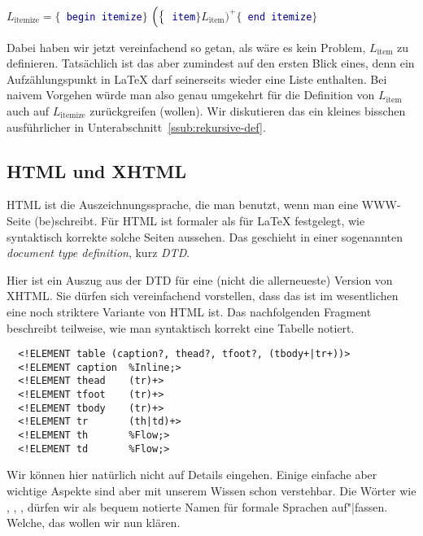 \noindent
$L_{\mathrm{itemize}} = \bigl\{$\textcolor{darkblue}{\texttt{
    begin itemize}}$\bigr\}$
$\Bigl(\bigl\{$\textcolor{darkblue}{\texttt{ item}}$\bigr\}
L_{\mathrm{item}}\Bigr)^+ \bigl\{$\textcolor{darkblue}{\texttt{
    end itemize}}$\bigr\}$ 

\noindent
Dabei haben wir jetzt vereinfachend so getan, als wäre es kein Problem,
$L_{\mathrm{item}}$ zu definieren. Tatsächlich ist das aber zumindest auf den
ersten Blick eines, denn ein Aufzählungspunkt in \LaTeX{} darf seinerseits
wieder eine Liste enthalten. Bei naivem Vorgehen würde man also genau
umgekehrt für die Definition von $L_{\mathrm{item}}$ auch auf
$L_{\mathrm{itemize}}$ zurückgreifen (wollen). Wir diskutieren das ein kleines
bisschen ausführlicher in Unterabschnitt~\ref{ssub:rekursive-def}.

\subsection{HTML und XHTML}

HTML ist die Auszeichnungssprache, die man benutzt, wenn man eine WWW-Seite
(be)schreibt. Für HTML ist formaler als für \LaTeX{} festgelegt, wie
syntaktisch korrekte solche Seiten aussehen. Das geschieht in einer
sogenannten \emph{document type definition}, kurz \emph{DTD}.

Hier ist ein Auszug aus der DTD für eine (nicht die allerneueste) Version von
XHTML. Sie dürfen sich vereinfachend vorstellen, dass das ist im wesentlichen
eine noch striktere Variante von HTML ist. Das nachfolgenden Fragment
beschreibt teilweise, wie man syntaktisch korrekt eine Tabelle notiert.

{\small
\begin{verbatim}
  <!ELEMENT table (caption?, thead?, tfoot?, (tbody+|tr+))>
  <!ELEMENT caption  %Inline;>
  <!ELEMENT thead    (tr)+>
  <!ELEMENT tfoot    (tr)+>
  <!ELEMENT tbody    (tr)+>
  <!ELEMENT tr       (th|td)+>
  <!ELEMENT th       %Flow;>
  <!ELEMENT td       %Flow;>
\end{verbatim}
} 

\noindent
Wir können hier natürlich nicht auf Details eingehen. Einige einfache
aber wichtige Aspekte sind aber mit unserem Wissen schon
verstehbar. Die Wörter wie , ,
, \usw dürfen wir als bequem notierte Namen für formale
Sprachen auf"|fassen. Welche, das wollen wir nun klären.

